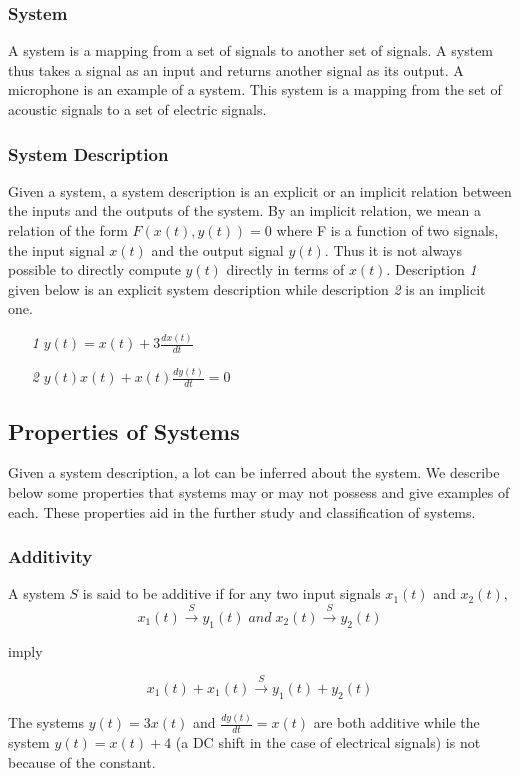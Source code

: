 \subsubsection{System}
A system is a mapping from a set of signals to another set of signals. A system thus takes a signal as an input and returns another signal as its output. A microphone is an example of a system. This system is a mapping from the set of acoustic signals to a set of electric signals.

\subsubsection{System Description}
Given a system, a system description is an explicit or an implicit relation between the inputs and the outputs of the system. By an implicit relation, we mean a relation of the form $F(x(t), y(t)) = 0$ where F is a function of two signals, the input signal $x(t)$ and the output signal $y(t)$. Thus it is not always possible to directly compute $y(t)$ directly in terms of $x(t)$. Description \textit{1} given below is an explicit system description while description \textit{2} is an implicit one.
\begin{enumerate}
\item[\textit{1}] $y(t) = x(t) + 3\frac{dx(t)}{dt}$
\item[\textit{2}] $y(t)x(t) + x(t)\frac{dy(t)}{dt} = 0$
\end{enumerate}

\subsection{Properties of Systems}
Given a system description, a lot can be inferred about the system. We describe below some properties that systems may or may not possess and give examples of each. These properties aid in the further study and classification of systems.

\subsubsection{Additivity}
A system $S$ is said to be additive if for any two input signals $x_{1}(t)$ and $x_{2}(t)$,
\[
x_{1}(t) \xrightarrow{S} y_{1}(t) \; and \; x_{2}(t) \xrightarrow{S} y_{2}(t)
\]
\begin{center}
imply
\end{center}
\[
x_{1}(t) + x_{1}(t) \xrightarrow{S} y_{1}(t) + y_{2}(t)
\]

The systems $y(t) = 3x(t)$ and $\frac{dy(t)}{dt} = x(t)$ are both additive while the system $y(t) = x(t) + 4$ (a DC shift in the case of electrical signals) is not because of the constant.

